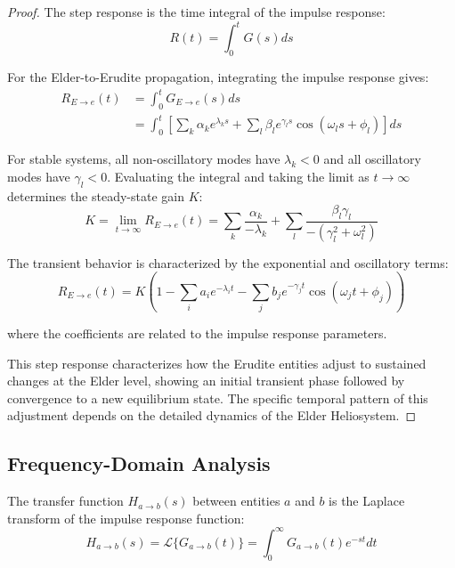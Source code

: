 \begin{proof}
The step response is the time integral of the impulse response:
\begin{equation}
R(t) = \int_0^t G(s) ds
\end{equation}

For the Elder-to-Erudite propagation, integrating the impulse response gives:
\begin{align}
R_{E \to e}(t) &= \int_0^t G_{E \to e}(s) ds \\
&= \int_0^t \left[ \sum_k \alpha_k e^{\lambda_k s} + \sum_l \beta_l e^{\gamma_l s} \cos(\omega_l s + \phi_l) \right] ds
\end{align}

For stable systems, all non-oscillatory modes have $\lambda_k < 0$ and all oscillatory modes have $\gamma_l < 0$. Evaluating the integral and taking the limit as $t \to \infty$ determines the steady-state gain $K$:
\begin{equation}
K = \lim_{t \to \infty} R_{E \to e}(t) = \sum_k \frac{\alpha_k}{-\lambda_k} + \sum_l \frac{\beta_l \gamma_l}{-(\gamma_l^2 + \omega_l^2)}
\end{equation}

The transient behavior is characterized by the exponential and oscillatory terms:
\begin{equation}
R_{E \to e}(t) = K \left( 1 - \sum_i a_i e^{-\lambda_i t} - \sum_j b_j e^{-\gamma_j t}\cos(\omega_j t + \phi_j) \right)
\end{equation}

where the coefficients are related to the impulse response parameters.

This step response characterizes how the Erudite entities adjust to sustained changes at the Elder level, showing an initial transient phase followed by convergence to a new equilibrium state. The specific temporal pattern of this adjustment depends on the detailed dynamics of the Elder Heliosystem.
\end{proof}

\subsection{Frequency-Domain Analysis}

\begin{definition}
The transfer function $H_{a \to b}(s)$ between entities $a$ and $b$ is the Laplace transform of the impulse response function:
\begin{equation}
H_{a \to b}(s) = \mathcal{L}\{G_{a \to b}(t)\} = \int_0^{\infty} G_{a \to b}(t) e^{-st} dt
\end{equation}
\end{definition}

